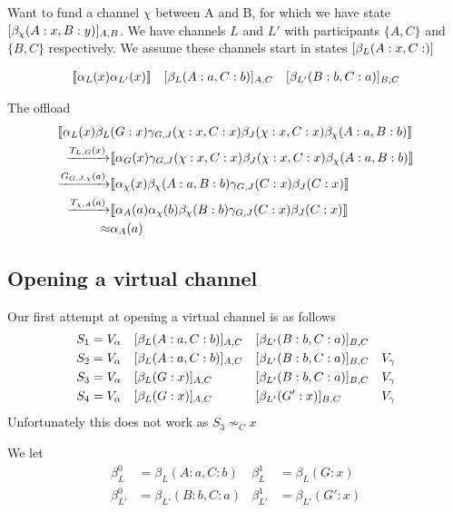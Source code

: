 Want to fund a channel $\chi$ between A and B, for which we have state $[\beta_\chi(A: x, B:y)]_{A,B}$. We have channels $L$ and $L'$ with participants $\{A, C\}$ and $\{B, C\}$ respectively. We assume these channels start in states $[\beta_L(A:x, C:)]$

\begin{align*}
  \llbracket \alpha_L(x)\alpha_{L'}(x) \rrbracket \quad [\beta_L(A: a, C: b)]_{A,C} \quad [\beta_{L'}(B:b, C:a)]_{B, C}
\end{align*}

The offload
\begin{align*}
  & \llbracket \alpha_L(x)\beta_L(G: x)\gamma_{G,J}(\chi: x, C: x)\beta_J(\chi: x, C: x)\beta_\chi(A: a, B: b) \rrbracket\\ 
  & \begin{aligned}
   \xrightarrow{T_{L,G}(x)} & \llbracket \alpha_G(x)\gamma_{G, J}(\chi: x, C: x)\beta_J(\chi: x, C: x)\beta_\chi(A: a, B: b) \rrbracket \\
   \xrightarrow{G_{G, J, \chi}(a)} & \llbracket \alpha_\chi(x)\beta_\chi(A: a, B: b)\gamma_{G, J}(C: x)\beta_J(C: x) \rrbracket \\
   \xrightarrow{T_{\chi, A}(a)} & \llbracket \alpha_A(a)\alpha_\chi(b)\beta_\chi(B: b)\gamma_{G, J}(C: x)\beta_J(C: x) \rrbracket \\
   \approx & \alpha_A(a)
  \end{aligned}
\end{align*}

\subsection{Opening a virtual channel}

Our first attempt at opening a virtual channel is as follows
\begin{align*}
S_1 &= V_\alpha &&[\beta_L(A: a, C: b)]_{A, C} && [\beta_{L'}(B:b, C: a)]_{B, C} & \\
S_2 &= V_\alpha &&[\beta_L(A: a, C: b)]_{A, C} && [\beta_{L'}(B:b, C: a)]_{B, C} & V_\gamma \\
S_3 &= V_\alpha &&[\beta_L(G: x)]_{A, C} && [\beta_{L'}(B:b, C: a)]_{B, C} & V_\gamma \\
S_4 &= V_\alpha &&[\beta_L(G: x)]_{A, C} && [\beta_{L'}(G': x)]_{B, C} & V_\gamma \\
\end{align*}
Unfortunately this does not work as $S_3 \nsim_C x$

We let
\begin{align*}
\beta_L^0 &= \beta_L(A:a, C: b) &
\beta_L^1 &= \beta_L(G: x) \\
\beta_{L'}^0 &= \beta_{L'}(B:b, C: a) &
\beta_{L'}^1 &= \beta_{L'}(G': x)
\end{align*}

